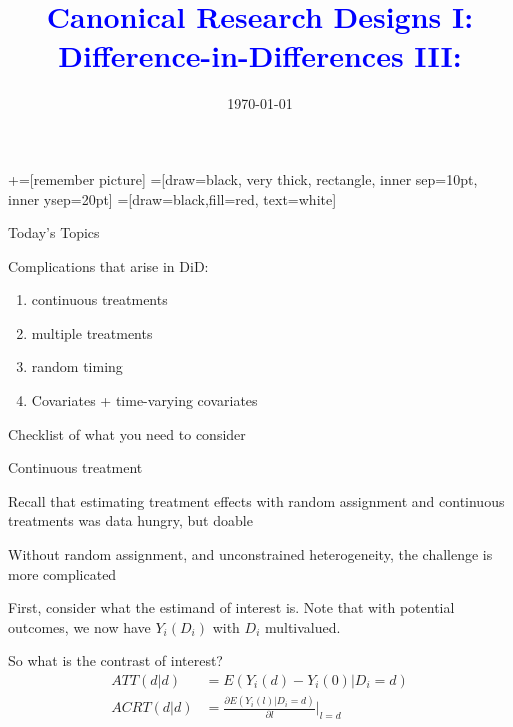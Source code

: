 \documentclass[notes,11pt, aspectratio=169]{beamer}
\title[]{\textcolor{blue}{Canonical Research Designs I:\\ Difference-in-Differences III:\\
  }}
\author[PGP]{}
\institute[FRBNY]{\small{\begin{tabular}{c}
  Paul Goldsmith-Pinkham  \\
\end{tabular}}}
\date{\today}
\newenvironment{wideitemize}{\itemize\addtolength{\itemsep}{10pt}}{\enditemize}
\begin{document}
\newcommand\marktopleft[1]{%
    \tikz[overlay,remember picture] 
        \node (marker-#1-a) at (-.3em,.3em) {};%
}
\newcommand\markbottomright[2]{%
    \tikz[overlay,remember picture] 
        \node (marker-#1-b) at (0em,0em) {};%
}
+=[remember picture] 
 =[draw=black, very thick, rectangle, inner sep=10pt, inner ysep=20pt]
 =[draw=black,fill=red, text=white]

\begin{frame}
\maketitle
\end{frame}

\begin{frame}{Today's Topics}
  \begin{wideitemize}
  \item Complications that arise in DiD:
    \begin{enumerate}
    \item continuous treatments
    \item multiple treatments
    \item random timing
    \item Covariates + time-varying covariates
    \end{enumerate}
  \item Checklist of what you need to consider
  \end{wideitemize}
\end{frame}

\begin{frame}{Continuous treatment}
  \begin{wideitemize}
  \item Recall that estimating treatment effects with random
    assignment and continuous treatments was data hungry, but doable
  \item Without random assignment, and unconstrained heterogeneity,
    the challenge is more complicated
  \item First, consider what the estimand of interest is. Note that with potential outcomes, we now have $Y_{i}(D_{i})$ with $D_{i}$ multivalued.
  \item So what is the contrast of interest?
    \begin{align}
      ATT(d|d) &= E(Y_{i}(d) - Y_{i}(0) | D_{i} = d)\\
      ACRT(d|d) &= \frac{\partial E(Y_{i}(l) | D_{i} = d)}{\partial l}\bigg\rvert_{l = d}
    \end{align}
  \end{wideitemize}
\end{frame}
\end{document}

